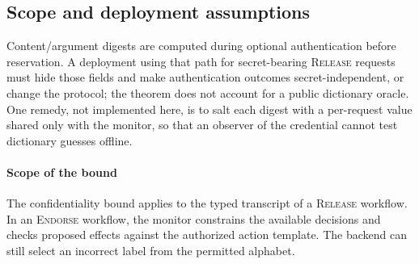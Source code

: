 \documentclass[conference,compsoc]{IEEEtran}
\newcommand{\rev}[1]{#1} %
\begin{document}
{\subsection{Scope and deployment assumptions}
\label{sec:security-scope}

Content/argument digests
are computed during optional authentication before reservation. A deployment
using that path for secret-bearing \textsc{Release} requests must hide those
fields and make authentication outcomes secret-independent, or change the
protocol; the theorem does not account for a public dictionary oracle. \rev{One remedy, not implemented here, is to salt each digest with a per-request value shared only with the monitor, so that an observer of the credential cannot test dictionary guesses offline.}

{
\paragraph{Scope of the bound}
The confidentiality bound applies to the typed transcript of a \textsc{Release} workflow. In an \textsc{Endorse} workflow, the monitor constrains the available decisions and checks proposed effects against the authorized action template. The backend can still select an incorrect label from the permitted alphabet.}

}
\end{document}
